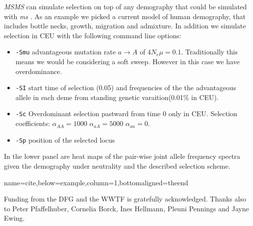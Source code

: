 \documentclass[portrait,final]{baposter}
\begin{document}
\begin{poster}
{ 


{\it MSMS} can simulate selection on top of any demography that could be simulated with {\it ms} . 
As an example we picked a current model of human
demography\cite{gutenkunst_inferringjoint_2009}, that includes bottle necks, growth, migration and admixture.
In addition we simulate selection in CEU with the following command line
options:
\begin{itemize}
\item {\tt  -Smu}  advantageous mutation rate $a\to A$ of $4N_e\mu=0.1$.
Traditionally this means we would be considering a soft sweep. However in this
case we have overdominance.
\item {\tt  -SI}   start time of selection (0.05) and frequencies of the the
advantageous allele in each deme from standing genetic varaition(0.01\% in CEU).
\item {\tt  -Sc}  Overdominant selection pastward from time 0 only in CEU.
Selection coefficients: $\alpha_{AA}=1000$ $\alpha_{aA}=5000$ $\alpha_{aa}=0$. 
\item  {\tt  -Sp} position of the selected locus 

\end{itemize}

In the lower panel are heat maps of the pair-wise joint allele frequency spectra given the demography 
under neutrality and the described selection scheme.
\vspace{0.4em}
}


{name=cite,below=example,column=1,bottomaligned=theend} { 
\small 

Funding from the DFG and the WWTF is gratefully acknowledged. Thanks also to
Peter Pfaffelhuber, Cornelia Borck, Ines Hellmann, Pleuni Pennings and Jayne
Ewing.

\vspace{-1.2cm}

\renewcommand\refname{}

}


\end{poster}%
\end{document}
